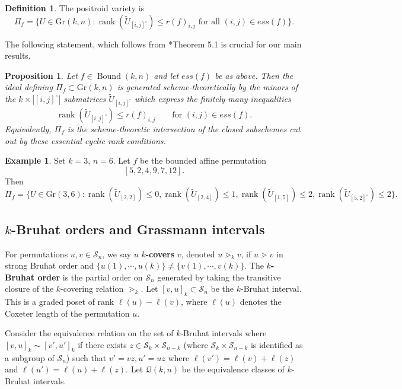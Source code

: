 \documentclass[12pt,reqno]{amsart}
\newtheorem{prop}[lemma]{Proposition}
\theoremstyle{definition}
\newtheorem{definition}[lemma]{Definition}
\newtheorem{example}[lemma]{Example}
\newcommand{\rank}{\operatorname{rank}}
\newcommand{\symm}{\mathcal{S}}
\newcommand{\gr}{\mathrm{Gr}}
\newcommand{\bound}{\operatorname{Bound}}
\begin{document}
{\begin{definition}\label{def:essential-rank}
    The positroid variety is 
    \begin{equation}\label{eqn:essential-rank}
    \Pi_f=\{U\in \gr(k,n): \rank(\widetilde{U}_{[i,j]^\circ})\leq r(f)_{i,j}\text{ for all }(i,j)\in ess(f)\}.
\end{equation}
\end{definition}

The following statement, which follows from \cite{KLS2014projections}*{Theorem 5.1} is crucial for our main results.

\begin{prop}\label{prop:basic-intersection}
Let \(f\in\bound(k,n)\) and let \(ess(f)\) be as above.
Then the ideal defining \(\Pi_f\subset\gr(k,n)\) is generated scheme-theoretically by
the minors of the \(k\times |[i,j]^\circ|\) submatrices \(\widetilde U_{[i,j]^\circ}\)
which express the finitely many inequalities
\[
\rank(\widetilde U_{[i,j]^\circ})\le r(f)_{i,j}\qquad\text{for }(i,j)\in ess(f).
\]
Equivalently, \(\Pi_f\) is the scheme-theoretic intersection of the closed subschemes cut out by
these essential cyclic rank conditions.
\end{prop}



\begin{example}
\label{ex:positroid-decompose}
    Set $k=3$, $n=6$. Let $f$ be the bounded affine permutation \[[5,2,4,9,7,12].\] Then 
    \[\Pi_f=\{U\in \gr(3,6): \rank(\widetilde{U}_{[2,2]})\le 0,\rank(\widetilde{U}_{[2,4]})\le 1,\rank(\widetilde{U}_{[1,5]})\le 2,\rank(\widetilde{U}_{[5,2]^\circ})\le 2\}.\]
\end{example}
\subsection{\texorpdfstring{$k$}{k}-Bruhat orders and Grassmann intervals}

For permutations $u,v\in \symm_n$, we say $u$ \textbf{$k$-covers} $v$, denoted $u\gtrdot_k v$, if $u\gtrdot v$ in strong Bruhat order and $\{u(1),\cdots, u(k)\}\neq \{v(1),\cdots, v(k)\}$. The \textbf{$k$-Bruhat order} is the partial order on $\symm_n$ generated by taking the transitive closure of the $k$-covering relation $\gtrdot_k$. Let $[v,u]_k\subset \symm_n$ be the $k$-Bruhat interval. This is a graded poset of rank $\ell(u)-\ell(v)$, where $\ell(u)$ denotes the Coxeter length of the permutation $u$.

Consider the equivalence relation on the set of $k$-Bruhat intervals where
$[v,u]_k \sim [v',u']_k$
if there exists $z\in \symm_k\times \symm_{n-k}$ (where $\symm_k\times \symm_{n-k}$ is identified as a subgroup of $\symm_n$) such that $v' = vz, u' = uz$ where $\ell(v') = \ell(v)+\ell(z)$ and $\ell(u') = \ell(u)+\ell(z)$. Let $\mathcal{Q}(k,n)$ be the equivalence classes of $k$-Bruhat intervals.

}
\end{document}
